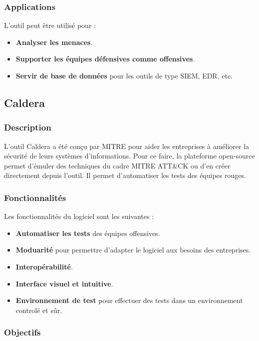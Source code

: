 \documentclass[12pt,letterpaper]{article}
\begin{document}
\subsubsection{Applications}

L'outil peut être utilisé pour :
\begin{itemize}
    \item \textbf{Analyser les menaces}.
    \item \textbf{Supporter les équipes défensives comme offensives}.
    \item \textbf{Servir de base de données} pour les outils de type SIEM, EDR, etc.
\end{itemize}

\subsection{Caldera}

\subsubsection{Description}

L'outil Caldera a été conçu par MITRE pour aider les entreprises à améliorer la sécurité de leurs systèmes d'informations.
Pour ce faire, la plateforme open-source permet d'émuler des techniques du cadre MITRE ATT\&CK ou d'en créer directement depuis l'outil.
Il permet d'automatiser les tests des équipes rouges.

\subsubsection{Fonctionnalités}

Les fonctionnalités du logiciel sont les suivantes :
\begin{itemize}
   \item \textbf{Automatiser les tests} des équipes offensives.
   \item \textbf{Moduarité} pour permettre d'adapter le logiciel aux besoins des entreprises.
   \item \textbf{Interopérabilité}.
   \item \textbf{Interface visuel et intuitive}.
   \item \textbf{Environnement de test} pour effectuer des tests dans un environnement controlé et sûr.
\end{itemize}

\subsubsection{Objectifs}
\end{document}
